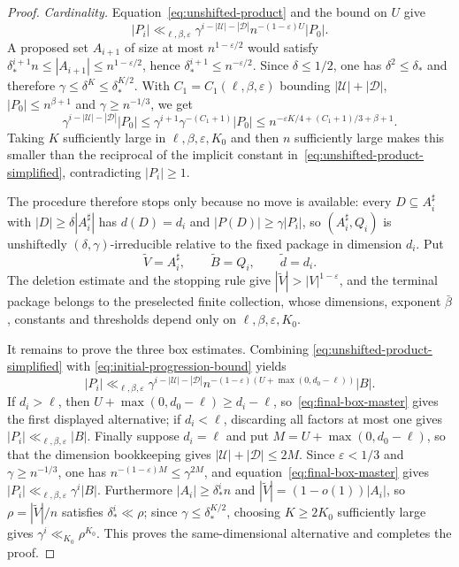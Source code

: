 \documentclass[11pt,reqno]{amsart}
\theoremstyle{definition}
\theoremstyle{remark}
\newcommand{\eps}{\varepsilon}
\begin{document}
\begin{proof}
\emph{Cardinality.}  Equation~\eqref{eq:unshifted-product} and the bound
on $U$ give
\begin{equation}
\label{eq:unshifted-product-simplified}
 |P_i|\ll_{\ell,\beta,\eps}
 \gamma^{i-|\mathcal U|-|\mathcal D|}
 n^{-(1-\eps)U}|P_0|.
\end{equation}
A proposed set $A_{i+1}$ of size at most $n^{1-\eps/2}$ would satisfy
$\delta_*^{i+1}n\le|A_{i+1}|\le n^{1-\eps/2}$, hence
$\delta_*^{i+1}\le n^{-\eps/2}$.  Since $\delta\le1/2$, one has
$\delta^2\le\delta_*$ and therefore
$\gamma\le\delta^K\le\delta_*^{K/2}$.  With
$C_1=C_1(\ell,\beta,\eps)$ bounding $|\mathcal U|+|\mathcal D|$,
$|P_0|\le n^{\beta+1}$ and $\gamma\ge n^{-1/3}$, we get
\[
 \gamma^{i-|\mathcal U|-|\mathcal D|}|P_0|
 \le\gamma^{i+1}\gamma^{-(C_1+1)}|P_0|
 \le n^{-\eps K/4+(C_1+1)/3+\beta+1}.
\]
Taking $K$ sufficiently large in $\ell,\beta,\eps,K_0$ and then $n$
sufficiently large makes this smaller than the reciprocal of the implicit
constant in~\eqref{eq:unshifted-product-simplified}, contradicting
$|P_i|\ge1$.

The procedure therefore stops only because no move is available: every
$D\subseteq A_i^\sharp$ with $|D|\ge\delta|A_i^\sharp|$ has $d(D)=d_i$
and $|P(D)|\ge\gamma|P_i|$, so $(A_i^\sharp,Q_i)$ is unshiftedly
$(\delta,\gamma)$-irreducible relative to the fixed package in dimension
$d_i$.  Put
\[
 \widetilde V=A_i^\sharp,
 \qquad
 \widetilde B=Q_i,
 \qquad
 \widetilde d=d_i.
\]
The deletion estimate and the stopping rule give
$|\widetilde V|>|V|^{1-\eps}$, and the terminal package belongs to the
preselected finite collection, whose dimensions, exponent $\bar\beta$,
constants and thresholds depend only on $\ell,\beta,\eps,K_0$.

It remains to prove the three box estimates.  Combining
\eqref{eq:unshifted-product-simplified} with
\eqref{eq:initial-progression-bound} yields
\begin{equation}
\label{eq:final-box-master}
 |P_i|\ll_{\ell,\beta,\eps}
 \gamma^{i-|\mathcal U|-|\mathcal D|}
 n^{-(1-\eps)(U+\max(0,d_0-\ell))}|B|.
\end{equation}
If $d_i>\ell$, then $U+\max(0,d_0-\ell)\ge d_i-\ell$,
so~\eqref{eq:final-box-master} gives the first displayed alternative; if
$d_i<\ell$, discarding all factors at most one gives
$|P_i|\ll_{\ell,\beta,\eps}|B|$.  Finally suppose $d_i=\ell$ and put
$M=U+\max(0,d_0-\ell)$, so that the dimension bookkeeping gives
$|\mathcal U|+|\mathcal D|\le2M$.  Since $\eps<1/3$ and
$\gamma\ge n^{-1/3}$, one has $n^{-(1-\eps)M}\le\gamma^{2M}$, and
equation~\eqref{eq:final-box-master} gives
$|P_i|\ll_{\ell,\beta,\eps}\gamma^i|B|$.  Furthermore
$|A_i|\ge\delta_*^in$ and $|\widetilde V|=(1-o(1))|A_i|$, so
$\rho=|\widetilde V|/n$ satisfies $\delta_*^i\ll\rho$; since
$\gamma\le\delta_*^{K/2}$, choosing $K\ge2K_0$ sufficiently large gives
$\gamma^i\ll_{K_0}\rho^{K_0}$.  This proves the same-dimensional
alternative and completes the proof.
\end{proof}
\end{document}
